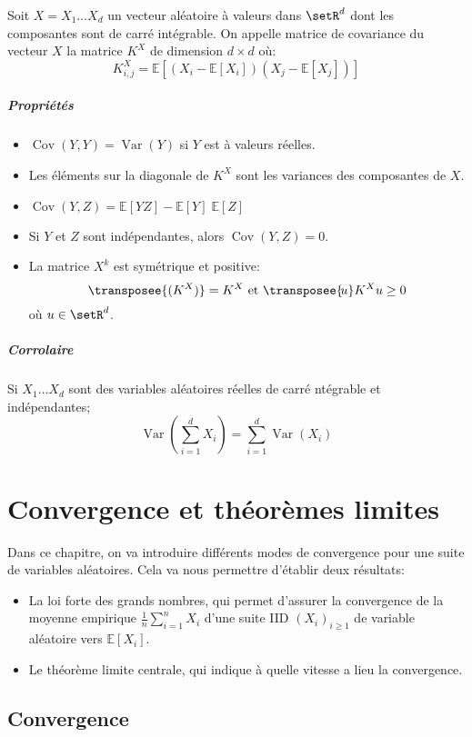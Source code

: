 \documentclass[a4paper,10pt,french,openany]{memoir}
\newcommand{\Esper}{\mathbb{E}}
\newcommand{\Xoned}{X_1\dots X_d}
\DeclareMathOperator{\Var}{Var}
\DeclareMathOperator{\Cov}{Cov}
\begin{document}
Soit $X=\Xoned$ un vecteur aléatoire à valeurs dans $\setR^d$ dont les composantes sont de carré intégrable. On appelle matrice de covariance du vecteur $X$ la matrice $K^X$ de dimension $d\times d$ où:
\[ K_{i,j}^X = \Esper[(X_i - \Esper[X_i]) (X_j-\Esper[X_j])] \]

\paragraph{Propriétés}
\begin{itemize}
 \item $\Cov(Y,Y)=\Var(Y)$ si $Y$ est à valeurs réelles.
 \item Les éléments sur la diagonale de $K^X$ sont les variances des composantes de $X$.
 \item $\Cov(Y,Z) = \Esper[YZ] - \Esper[Y]\;\Esper[Z]$
 \item Si $Y$ et $Z$ sont indépendantes, alors $\Cov(Y,Z)=0$.
 \item La matrice $X^k$ est symétrique et positive:
 \[ \transposee{(K^X)} = K^X \text{ et } \transposee{\!u} K^X u \geq 0 \] où $u\in\setR^d$.
\end{itemize}

\paragraph{Corrolaire}
Si $\Xoned$ sont des variables aléatoires réelles de carré ntégrable et indépendantes;
\[ \Var\left(\sum_{i=1}^d X_i\right) = \sum_{i=1}^d \Var(X_i) \]

\chapter{Convergence et théorèmes limites}

Dans ce chapitre, on va introduire différents modes de convergence pour une suite de variables aléatoires. Cela va nous permettre d'établir deux résultats:
\begin{itemize}
 \item La loi forte des grands nombres, qui permet d'assurer la convergence de la moyenne empirique $\frac 1 n \sum_{i=1}^n X_i$ d'une suite IID $(X_i)_{i\geq1}$ de variable aléatoire vers $\Esper[X_i]$.
 
 \item Le théorème limite centrale, qui indique à quelle vitesse a lieu la convergence.
\end{itemize}

\section{Convergence}
\end{document}
